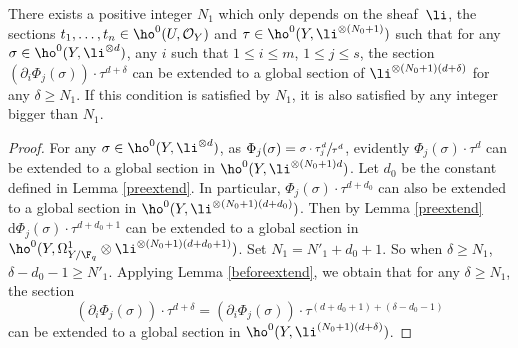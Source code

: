 \begin{lem}\label{extend}
There exists a positive integer $N_1$ which only depends on the sheaf~$\li$, the sections $t_1,\dots, t_n\in \ho^0(U, \mathcal{O}_Y)$ and $\tau\in \ho^0(Y, \li^{\otimes (N_0+1)})$ such that for any $\sigma \in \ho^0(Y, \li^{\otimes d})$, any $i$ such that $1\leq i\leq m$, $1\leq j\leq s$, the section $\left(\partial_i \Phi_j(\sigma) \right)\cdot \tau^{d+\delta}$ can be extended to a global section of $\li^{\otimes (N_0+1)(d+\delta)}$ for any $\delta \geq N_1$. If this condition is satisfied by $N_1$, it is also satisfied by any integer bigger than $N_1$.
\end{lem}
\begin{proof}[Proof]
For any $\sigma \in \ho^0(Y, \li^{\otimes d})$, as $\Phi_j(\sigma)=\sfrac{\sigma \cdot \tau_j^d}{\tau^d}$, evidently $\Phi_j(\sigma)\cdot \tau^d$ can be extended to a global section in $\ho^0(Y, \li^{\otimes (N_0+1)d})$. Let $d_0$ be the constant defined in Lemma \ref{preextend}. In particular, $\Phi_j(\sigma)\cdot \tau^{d+d_0}$ can also be extended to a global section in $\ho^0(Y, \li^{\otimes (N_0+1)(d+d_0)})$. Then by Lemma \ref{preextend} $\mathrm{d}\Phi_j(\sigma)\cdot \tau^{d+d_0+1}$ can be extended to a global section in $\ho^0(Y, \Omega_{Y/\F_q}^1\otimes \li^{\otimes (N_0+1)(d+d_0+1)})$.
Set $N_1=N'_1+d_0+1$. So when $\delta\geq N_1$, $\delta-d_0-1\geq N'_1$. Applying Lemma \ref{beforeextend}, we obtain that for any $\delta\geq N_1$, the section\vspace*{-3pt}
\[
\left(\partial_i \Phi_j(\sigma) \right)\cdot \tau^{d+\delta}=\left(\partial_i \Phi_j(\sigma) \right)\cdot \tau^{(d+d_0+1)+(\delta-d_0-1)}
\]
can be extended to a global section in $\ho^0(Y, \li^{(N_0+1)(d+\delta)})$.
\end{proof}

